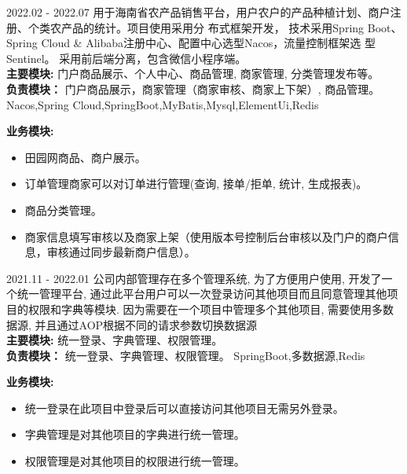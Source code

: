 \documentclass[zh]{resume}
\begin{document}
\begin{projects}
	\project
  {\color{accentcolor}{田园网}}{2022.02 - 2022.07}
  {
    用于海南省农产品销售平台，用户农户的产品种植计划、商户注册、个类农产品的统计。项目使用采用分 布式框架开发，
    技术采用Spring Boot、Spring Cloud \& Alibaba注册中心、配置中心选型Nacos，流量控制框架选 型Sentinel。
    采用前后端分离，包含微信小程序端。\\ 
  {\textbf{主要模块: } 门户商品展示、个人中心、商品管理, 商家管理, 分类管理发布等。} \\
  {\textbf{负责模块：} 门户商品展示，商家管理（商家审核、商家上下架）, 商品管理。}
  }
  {Nacos,Spring Cloud,SpringBoot,MyBatis,Mysql,ElementUi,Redis}
  {
    {\textbf{业务模块: }}
    \begin{itemize}
      \item 田园网商品、商户展示。
      \item 订单管理商家可以对订单进行管理(查询, 接单/拒单, 统计, 生成报表)。
      \item 商品分类管理。
      \item 商家信息填写审核以及商家上架（使用版本号控制后台审核以及门户的商户信息，审核通过同步最新商户信息）。
    \end{itemize}
  }

	\project
  {\color{accentcolor}{统一管理平台}}{2021.11 - 2022.01}
  {
    公司内部管理存在多个管理系统, 为了方便用户使用, 开发了一个统一管理平台, 
    通过此平台用户可以一次登录访问其他项目而且同意管理其他项目的权限和字典等模块. 
    因为需要在一个项目中管理多个其他项目, 需要使用多数据源, 并且通过AOP根据不同的请求参数切换数据源\\
    {\textbf{主要模块: } 统一登录、字典管理、权限管理。} \\
    {\textbf{负责模块：} 统一登录、字典管理、权限管理。}
  }
  {SpringBoot,多数据源,Redis}
  {
    {\textbf{业务模块:}}
    \begin{itemize}
      \item 统一登录在此项目中登录后可以直接访问其他项目无需另外登录。
      \item 字典管理是对其他项目的字典进行统一管理。
      \item 权限管理是对其他项目的权限进行统一管理。
    \end{itemize}
  }


\end{projects}
\end{document}
